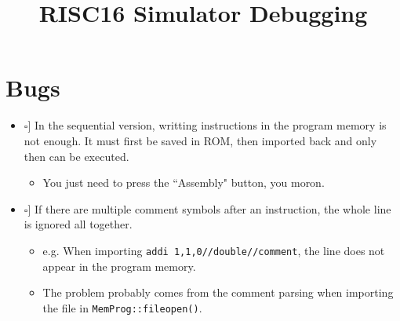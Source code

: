 \documentclass[12pt,a4paper]{extarticle}
\title{RISC16 Simulator Debugging}
\newcommand{\done}{\makebox[0pt][l]{$\square$}\raisebox{.15ex}{\hspace{0.1em}$\checkmark$}}%
\begin{document}
\maketitle

\section{Bugs}

\begin{itemize}
  \item[\done] In the sequential version, writting instructions in the program memory is not enough.
  It must first be saved in ROM, then imported back and only then can be executed.
  \begin{itemize}
    \item You just need to press the ``Assembly" button, you moron.
  \end{itemize}

  \item[\done] If there are multiple comment symbols after an instruction, the whole line is ignored all together.
  \begin{itemize}
    \item e.g. When importing \texttt{addi 1,1,0//double//comment}, the line does not appear in the program memory.
    \item The problem probably comes from the comment parsing when importing the file in \texttt{MemProg::fileopen()}.
  \end{itemize}


\end{itemize}
\end{document}
